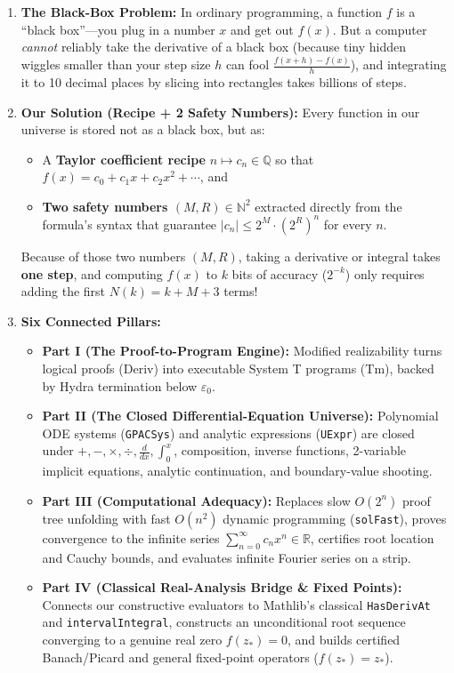 \documentclass[11pt,a4paper]{article}
\newcommand{\Deriv}{\ensuremath{\mathrm{Deriv}}}
\newcommand{\Tm}{\ensuremath{\mathrm{Tm}}}
\newcommand{\N}{\ensuremath{\mathbb{N}}}
\newcommand{\Q}{\ensuremath{\mathbb{Q}}}
\newcommand{\R}{\ensuremath{\mathbb{R}}}
\newcommand{\lean}[1]{\texttt{\nolinkurl{#1}}}
\begin{document}
\begin{enumerate}
  \item \textbf{The Black-Box Problem:} In ordinary programming, a function $f$ is a ``black box''---you plug in a number $x$ and get out $f(x)$. But a computer \emph{cannot} reliably take the derivative of a black box (because tiny hidden wiggles smaller than your step size $h$ can fool $\frac{f(x+h)-f(x)}{h}$), and integrating it to 10 decimal places by slicing into rectangles takes billions of steps.
  \item \textbf{Our Solution (Recipe + 2 Safety Numbers):} Every function in our universe is stored not as a black box, but as:
  \begin{itemize}
    \item A \textbf{Taylor coefficient recipe} $n \mapsto c_n \in \Q$ so that $f(x) = c_0 + c_1 x + c_2 x^2 + \cdots$, and
    \item \textbf{Two safety numbers $(M, R) \in \N^2$} extracted directly from the formula's syntax that guarantee $|c_n| \le 2^M \cdot (2^R)^n$ for every $n$.
  \end{itemize}
  Because of those two numbers $(M, R)$, taking a derivative or integral takes \textbf{one step}, and computing $f(x)$ to $k$ bits of accuracy ($2^{-k}$) only requires adding the first $N(k) = k + M + 3$ terms!
  \item \textbf{Six Connected Pillars:}
  \begin{itemize}
    \item \textbf{Part I (The Proof-to-Program Engine):} Modified realizability turns logical proofs ($\Deriv$) into executable System T programs ($\Tm$), backed by Hydra termination below $\varepsilon_0$.
    \item \textbf{Part II (The Closed Differential-Equation Universe):} Polynomial ODE systems (\lean{GPACSys}) and analytic expressions (\lean{UExpr}) are closed under $+,-,\times,\div,\frac{d}{dx},\int_0^x$, composition, inverse functions, 2-variable implicit equations, analytic continuation, and boundary-value shooting.
    \item \textbf{Part III (Computational Adequacy):} Replaces slow $O(2^n)$ proof tree unfolding with fast $O(n^2)$ dynamic programming (\lean{solFast}), proves convergence to the infinite series $\sum_{n=0}^\infty c_n x^n \in \R$, certifies root location and Cauchy bounds, and evaluates infinite Fourier series on a strip.
    \item \textbf{Part IV (Classical Real-Analysis Bridge \& Fixed Points):} Connects our constructive evaluators to Mathlib's classical \lean{HasDerivAt} and \lean{intervalIntegral}, constructs an unconditional root sequence converging to a genuine real zero $f(z_*)=0$, and builds certified Banach/Picard and general fixed-point operators ($f(z_*)=z_*$).

\end{itemize}
\end{enumerate}
\end{document}
